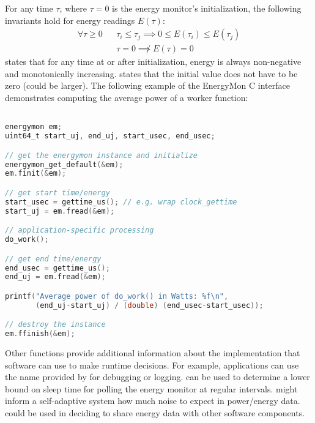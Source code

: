 For any time $\tau$, where $\tau=0$ is the energy monitor's initialization, the following invariants hold for energy readings $E(\tau)$:
\begin{eqnarray}
  \forall \tau \ge 0 && \tau_i \le \tau_j \implies 0 \le E(\tau_i) \le E(\tau_j) \label{eqn:energy-monotonic} \\
  && \tau = 0 \not \implies E(\tau) = 0 \label{eqn:energy-time-zero}
\end{eqnarray}
 states that for any time at or after initialization, energy is always non-negative and monotonically increasing.
 states that the initial value does not have to be zero (could be larger).
The following example of the EnergyMon C interface demonstrates computing the average power of a worker function:
%
\begin{lstlisting}[language=C,%
  caption={Reading energy values and computing power with EnergyMon.},%
  morekeywords={uint64_t},%
  label={lst:energymon-example}]%

energymon em;
uint64_t start_uj, end_uj, start_usec, end_usec;

// get the energymon instance and initialize
energymon_get_default(&em);
em.finit(&em);

// get start time/energy
start_usec = gettime_us(); // e.g. wrap clock_gettime
start_uj = em.fread(&em);

// application-specific processing
do_work();

// get end time/energy
end_usec = gettime_us();
end_uj = em.fread(&em);

printf("Average power of do_work() in Watts: %f\n",
       (end_uj-start_uj) / (double) (end_usec-start_usec));

// destroy the instance
em.ffinish(&em);
\end{lstlisting}
Other functions provide additional information about the implementation that software can use to make runtime decisions.
For example, applications can use the name provided by  for debugging or logging.
 can be used to determine a lower bound on sleep time for polling the energy monitor at regular intervals.
 might inform a self-adaptive system how much noise to expect in power/energy data.
 could be used in deciding to share energy data with other software components.

